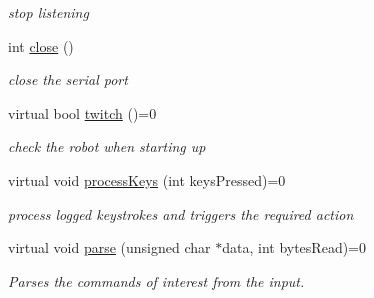 \begin{DoxyCompactItemize}
\begin{DoxyCompactList}\small\item\em stop listening \end{DoxyCompactList}\item 
\hypertarget{class_robot_a091253a377e3f6944616ee0f0fad8941}{}int \hyperlink{class_robot_a091253a377e3f6944616ee0f0fad8941}{close} ()\label{class_robot_a091253a377e3f6944616ee0f0fad8941}

\begin{DoxyCompactList}\small\item\em close the serial port \end{DoxyCompactList}\item 
\hypertarget{class_robot_a89c1fc16ed3ae6bb3162837b1fbf689a}{}virtual bool \hyperlink{class_robot_a89c1fc16ed3ae6bb3162837b1fbf689a}{twitch} ()=0\label{class_robot_a89c1fc16ed3ae6bb3162837b1fbf689a}

\begin{DoxyCompactList}\small\item\em check the robot when starting up \end{DoxyCompactList}\item 
\hypertarget{class_robot_ac09d08242ccbdd6c4bc68bfe689759f0}{}virtual void \hyperlink{class_robot_ac09d08242ccbdd6c4bc68bfe689759f0}{process\+Keys} (int keys\+Pressed)=0\label{class_robot_ac09d08242ccbdd6c4bc68bfe689759f0}

\begin{DoxyCompactList}\small\item\em process logged keystrokes and triggers the required action \end{DoxyCompactList}\item 
\hypertarget{class_robot_a7dcc9de1f4a64894bdc047efd5db8a2b}{}virtual void \hyperlink{class_robot_a7dcc9de1f4a64894bdc047efd5db8a2b}{parse} (unsigned char $\ast$data, int bytes\+Read)=0\label{class_robot_a7dcc9de1f4a64894bdc047efd5db8a2b}

\begin{DoxyCompactList}\small\item\em Parses the commands of interest from the input. \end{DoxyCompactList}\end{DoxyCompactItemize}
